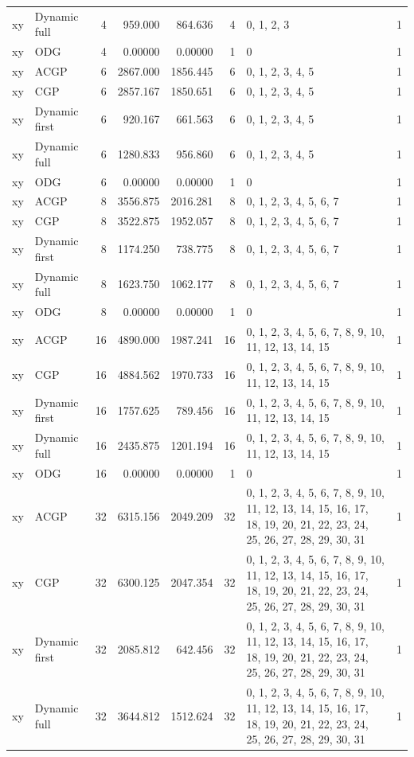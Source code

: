 \documentclass[10pt,a4paper]{article}
\begin{document}
\begin{longtable}{@{}p{23mm}p{29mm}rrrrp{36mm}r@{}}
xy & Dynamic full & 4 & 959.000 & 864.636 & 4 & 0, 1, 2, 3 & 1 \\
xy & ODG & 4 & 0.00000 & 0.00000 & 1 & 0 & 1 \\
xy & ACGP & 6 & 2867.000 & 1856.445 & 6 & 0, 1, 2, 3, 4, 5 & 1 \\
xy & CGP & 6 & 2857.167 & 1850.651 & 6 & 0, 1, 2, 3, 4, 5 & 1 \\
xy & Dynamic first & 6 & 920.167 & 661.563 & 6 & 0, 1, 2, 3, 4, 5 & 1 \\
xy & Dynamic full & 6 & 1280.833 & 956.860 & 6 & 0, 1, 2, 3, 4, 5 & 1 \\
xy & ODG & 6 & 0.00000 & 0.00000 & 1 & 0 & 1 \\
xy & ACGP & 8 & 3556.875 & 2016.281 & 8 & 0, 1, 2, 3, 4, 5, 6, 7 & 1 \\
xy & CGP & 8 & 3522.875 & 1952.057 & 8 & 0, 1, 2, 3, 4, 5, 6, 7 & 1 \\
xy & Dynamic first & 8 & 1174.250 & 738.775 & 8 & 0, 1, 2, 3, 4, 5, 6, 7 & 1 \\
xy & Dynamic full & 8 & 1623.750 & 1062.177 & 8 & 0, 1, 2, 3, 4, 5, 6, 7 & 1 \\
xy & ODG & 8 & 0.00000 & 0.00000 & 1 & 0 & 1 \\
xy & ACGP & 16 & 4890.000 & 1987.241 & 16 & 0, 1, 2, 3, 4, 5, 6, 7, 8, 9, 10, 11, 12, 13, 14, 15 & 1 \\
xy & CGP & 16 & 4884.562 & 1970.733 & 16 & 0, 1, 2, 3, 4, 5, 6, 7, 8, 9, 10, 11, 12, 13, 14, 15 & 1 \\
xy & Dynamic first & 16 & 1757.625 & 789.456 & 16 & 0, 1, 2, 3, 4, 5, 6, 7, 8, 9, 10, 11, 12, 13, 14, 15 & 1 \\
xy & Dynamic full & 16 & 2435.875 & 1201.194 & 16 & 0, 1, 2, 3, 4, 5, 6, 7, 8, 9, 10, 11, 12, 13, 14, 15 & 1 \\
xy & ODG & 16 & 0.00000 & 0.00000 & 1 & 0 & 1 \\
xy & ACGP & 32 & 6315.156 & 2049.209 & 32 & 0, 1, 2, 3, 4, 5, 6, 7, 8, 9, 10, 11, 12, 13, 14, 15, 16, 17, 18, 19, 20, 21, 22, 23, 24, 25, 26, 27, 28, 29, 30, 31 & 1 \\
xy & CGP & 32 & 6300.125 & 2047.354 & 32 & 0, 1, 2, 3, 4, 5, 6, 7, 8, 9, 10, 11, 12, 13, 14, 15, 16, 17, 18, 19, 20, 21, 22, 23, 24, 25, 26, 27, 28, 29, 30, 31 & 1 \\
xy & Dynamic first & 32 & 2085.812 & 642.456 & 32 & 0, 1, 2, 3, 4, 5, 6, 7, 8, 9, 10, 11, 12, 13, 14, 15, 16, 17, 18, 19, 20, 21, 22, 23, 24, 25, 26, 27, 28, 29, 30, 31 & 1 \\
xy & Dynamic full & 32 & 3644.812 & 1512.624 & 32 & 0, 1, 2, 3, 4, 5, 6, 7, 8, 9, 10, 11, 12, 13, 14, 15, 16, 17, 18, 19, 20, 21, 22, 23, 24, 25, 26, 27, 28, 29, 30, 31 & 1 \\

\end{longtable}
\end{document}
